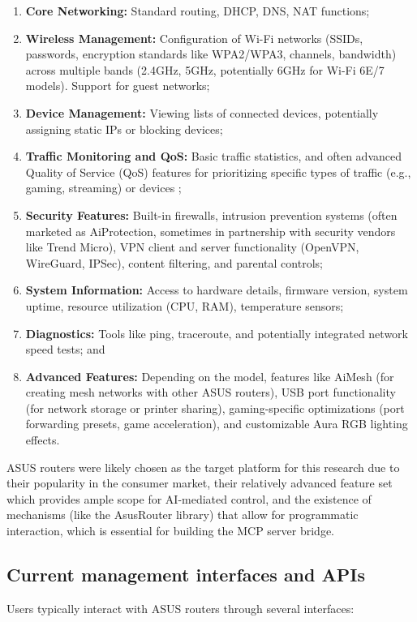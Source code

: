 \begin{enumerate}
\item \textbf{Core Networking:} Standard routing, DHCP, DNS, NAT functions;
\item \textbf{Wireless Management:} Configuration of Wi-Fi networks (SSIDs, passwords, encryption standards like WPA2/WPA3, channels, bandwidth) across multiple bands (2.4GHz, 5GHz, potentially 6GHz for Wi-Fi 6E/7 models). Support for guest networks;
\item \textbf{Device Management:} Viewing lists of connected devices, potentially assigning static IPs or blocking devices;
\item \textbf{Traffic Monitoring and QoS:} Basic traffic statistics, and often advanced Quality of Service (QoS) features for prioritizing specific types of traffic (e.g., gaming, streaming) or devices \cite{tplink_qos};
\item \textbf{Security Features:} Built-in firewalls, intrusion prevention systems (often marketed as AiProtection, sometimes in partnership with security vendors like Trend Micro), VPN client and server functionality (OpenVPN, WireGuard, IPSec), content filtering, and parental controls;
\item \textbf{System Information:} Access to hardware details, firmware version, system uptime, resource utilization (CPU, RAM), temperature sensors;
\item \textbf{Diagnostics:} Tools like ping, traceroute, and potentially integrated network speed tests; and
\item \textbf{Advanced Features:} Depending on the model, features like AiMesh (for creating mesh networks with other ASUS routers), USB port functionality (for network storage or printer sharing), gaming-specific optimizations (port forwarding presets, game acceleration), and customizable Aura RGB lighting effects.
\end{enumerate}

ASUS routers were likely chosen as the target platform for this research due to their popularity in the consumer market, their relatively advanced feature set which provides ample scope for AI-mediated control, and the existence of mechanisms (like the AsusRouter library) that allow for programmatic interaction, which is essential for building the MCP server bridge.

\subsection{Current management interfaces and APIs}
Users typically interact with ASUS routers through several interfaces:

